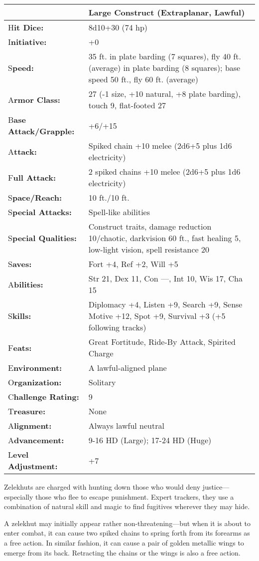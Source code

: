 \documentclass{article}
\begin{document}
\begin{tabular}{|>{\raggedright}p{77pt}|>{\raggedright}p{249pt}|}
\hline
  & Large Construct (Extraplanar, Lawful)\tabularnewline
\hline
H\textbf{it Dice:} & 8d10+30 (74 hp)\tabularnewline
\hline
I\textbf{nitiative:} & +0\tabularnewline
\hline
S\textbf{peed:} & 35 ft. in plate barding (7 squares), fly 40 ft. (average) in 
plate barding (8 squares); base speed 50 ft., fly 60 ft. (average)\tabularnewline
\hline
A\textbf{rmor Class:} & 27 (-1 size, +10 natural, +8 plate barding), touch 9, flat-footed 
27\tabularnewline
\hline
B\textbf{ase Attack/Grapple:} & +6/+15\tabularnewline
\hline
A\textbf{ttack:} & Spiked chain +10 melee (2d6+5 plus 1d6 electricity)\tabularnewline
\hline
F\textbf{ull Attack:} & 2 spiked chains +10 melee (2d6+5 plus 1d6 electricity)\tabularnewline
\hline
S\textbf{pace/Reach:} & 10 ft./10 ft.\tabularnewline
\hline
S\textbf{pecial Attacks:} & Spell-like abilities\tabularnewline
\hline
S\textbf{pecial Qualities:} & Construct traits, damage reduction 10/chaotic, darkvision 
60 ft., fast healing 5, low-light vision, spell resistance 20\tabularnewline
\hline
S\textbf{aves:} & Fort +4, Ref +2, Will +5\tabularnewline
\hline
A\textbf{bilities:} & Str 21, Dex 11, Con ---, Int 10, Wis 17, Cha 15\tabularnewline
\hline
S\textbf{kills:} & Diplomacy +4, Listen +9, Search +9, Sense Motive +12, Spot +9, 
Survival +3 (+5 following tracks)\tabularnewline
\hline
F\textbf{eats:} & Great Fortitude, Ride-By Attack, Spirited Charge\tabularnewline
\hline
E\textbf{nvironment:} & A lawful-aligned plane\tabularnewline
\hline
O\textbf{rganization:} & Solitary\tabularnewline
\hline
C\textbf{hallenge Rating:} & 9\tabularnewline
\hline
T\textbf{reasure:} & None\tabularnewline
\hline
A\textbf{lignment:} & Always lawful neutral\tabularnewline
\hline
A\textbf{dvancement:} & 9-16 HD (Large); 17-24 HD (Huge)\tabularnewline
\hline
L\textbf{evel Adjustment:} & +7\tabularnewline
\hline
\end{tabular}

Zelekhuts are charged with hunting down those who would deny justice---especially 
those who flee to escape punishment. Expert trackers, they use a combination of 
natural skill and magic to find fugitives wherever they may hide.

A zelekhut may initially appear rather non-threatening---but when it is about to 
enter combat, it can cause two spiked chains to spring forth from its forearms 
as a free action. In similar fashion, it can cause a pair of golden metallic wings 
to emerge from its back. Retracting the chains or the wings is also a free action.
\end{document}
